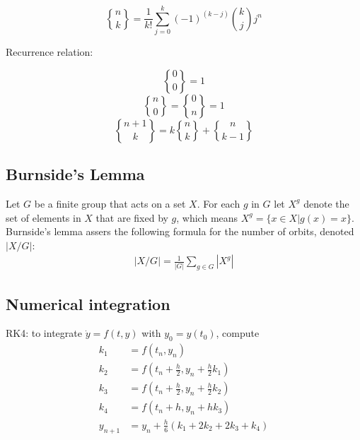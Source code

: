 $${n \brace k}=\frac{1}{k!}\sum_{j=0}^{k}(-1)^{(k-j)}{k \choose j}j^n$$

Recurrence relation:

  $${0 \brace 0}=1$$
  $${n \brace 0}={0 \brace n}=1$$
  $${n+1 \brace k}=k{n \brace k}+{n \brace k-1}$$


\subsection{Burnside's Lemma}
Let $G$ be a finite group that acts on a set $X$. For each $g$ in $G$ let $X^g$ denote the set of elements in $X$ that are fixed by $g$, which means $X^g=\{x\in X| g(x)=x\}$. Burnside's lemma assers the following formula for the number of orbits, denoted $|X/G|$:
\begin{align*}
|X/G|=\frac{1}{|G|} \sum_{g\in G} |X^g|
\end{align*}

\subsection{Numerical integration}
RK4: to integrate $\dot{y} = f(t, y)$ with $y_0 = y(t_0)$, compute
\begin{align*}
  k_1 &= f(t_n, y_n) \\
  k_2 &= f(t_n + \frac h 2, y_n + \frac h 2 k_1) \\
  k_3 &= f(t_n + \frac h 2, y_n + \frac h 2 k_2) \\
  k_4 &= f(t_n + h, y_n + h k_3) \\
  y_{n+1} &= y_n + \frac h 6 (k_1 + 2k_2 + 2k_3 + k_4) 
\end{align*}
